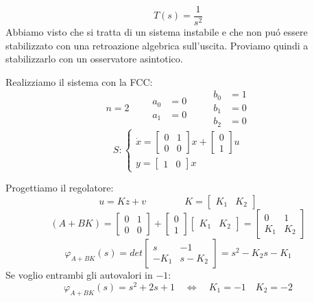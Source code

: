 \documentclass[../main.tex]{subfiles}
\begin{document}
		\begin{Exercise}[title={Stabilizzazione di un sistema con osservatore}, difficulty=1]
			\[
				T(s) = \dfrac{1}{s^2}
			\]
			Abbiamo visto che si tratta di un sistema instabile e che non pu\'o essere stabilizzato con una retroazione algebrica sull'uscita. Proviamo quindi a stabilizzarlo con un osservatore asintotico.
			
			Realizziamo il sistema con la FCC:
			\[
				n = 2
				\qquad
				\begin{aligned}
					a_0 &= 0\\
					a_1 &= 0
				\end{aligned}
				\qquad
				\begin{aligned}
					b_0 &= 1\\
					b_1 &= 0\\
					b_2 &= 0
				\end{aligned}
			\]
			\[
				S:
				\begin{cases}
					\dot x =
					\begin{bmatrix}
						0 & 1\\
						0 & 0
					\end{bmatrix} x+
					\begin{bmatrix}
						0\\
						1
					\end{bmatrix} u
					\\
					y =
					\begin{bmatrix}
						1 & 0
					\end{bmatrix} x
				\end{cases}
			\]
			
			Progettiamo il regolatore:
			\[
				u = Kz + v \qquad\qquad K =
				\begin{bmatrix}
					K_1 & K_2
				\end{bmatrix}
			\]
			\[
				(A+BK) =
				\begin{bmatrix}
					0 & 1\\
					0 & 0
				\end{bmatrix} +
				\begin{bmatrix}
					0\\
					1
				\end{bmatrix}
				\begin{bmatrix}
					K_1 & K_2
				\end{bmatrix} =
				\begin{bmatrix}
					0 & 1\\
					K_1 & K_2
				\end{bmatrix}
			\]
			\[
				\varphi_{A+BK}(s) = det
				\begin{bmatrix}
					s & -1\\
					-K_1 & s-K_2
				\end{bmatrix} = s^2 - K_2s - K_1
			\]
			Se voglio entrambi gli autovalori in $ -1 $:
			\[
				\varphi_{A+BK}(s) = s^2 + 2s + 1 \quad\Leftrightarrow\quad K_1 = -1 \quad K_2 = -2
			\]
			

\end{Exercise}
\end{document}
